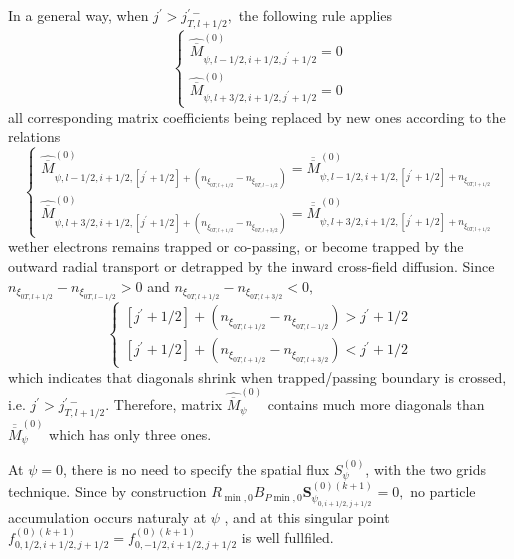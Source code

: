 In a general way, when $j^{\prime }>j_{T,l+1/2}^{\prime -},$ the following
rule applies
\begin{equation}
\left\{
\begin{array}{l}
\widehat{\overline{M}}_{\psi ,l-1/2,i+1/2,j^{\prime }+1/2}^{\left( 0\right)
}=0 \\
\widehat{\overline{M}}_{\psi ,l+3/2,i+1/2,j^{\prime }+1/2}^{\left( 0\right)
}=0
\end{array}
\right.
\end{equation}
all corresponding matrix coefficients being replaced by new ones according
to the relations
\begin{equation}
\left\{
\begin{array}{l}
\widehat{\overline{M}}_{\psi ,l-1/2,i+1/2,\left[ j^{\prime }+1/2\right]
+\left( n_{\xi _{0T,l+1/2}}-n_{\xi _{0T,l-1/2}}\right) }^{\left( 0\right) }=%
\overline{\overline{M}}_{\psi ,l-1/2,i+1/2,\left[ j^{\prime }+1/2\right]
+n_{\xi _{0T,l+1/2}}}^{\left( 0\right) } \\
\widehat{\overline{M}}_{\psi ,l+3/2,i+1/2,\left[ j^{\prime }+1/2\right]
+\left( n_{\xi _{0T,l+1/2}}-n_{\xi _{0T,l+3/2}}\right) }^{\left( 0\right) }=%
\overline{\overline{M}}_{\psi ,l+3/2,i+1/2,\left[ j^{\prime }+1/2\right]
+n_{\xi _{0T,l+1/2}}}^{\left( 0\right) }
\end{array}
\right.
\end{equation}
wether electrons remains trapped or co-passing, or become trapped by the
outward radial transport or detrapped by the inward cross-field diffusion.
Since $n_{\xi _{0T,l+1/2}}-n_{\xi _{0T,l-1/2}}>0$ and $n_{\xi
_{0T,l+1/2}}-n_{\xi _{0T,l+3/2}}<0,$
\begin{equation}
\left\{
\begin{array}{l}
\left[ j^{\prime }+1/2\right] +\left( n_{\xi _{0T,l+1/2}}-n_{\xi
_{0T,l-1/2}}\right) >j^{\prime }+1/2 \\
\left[ j^{\prime }+1/2\right] +\left( n_{\xi _{0T,l+1/2}}-n_{\xi
_{0T,l+3/2}}\right) <j^{\prime }+1/2
\end{array}
\right.
\end{equation}
which indicates that diagonals shrink when trapped/passing boundary is
crossed, i.e. $j^{\prime }>j_{T,l+1/2}^{\prime -}.$ Therefore, matrix $%
\widehat{\overline{M}}_{\psi }^{\left( 0\right) }$ contains much more
diagonals than $\overline{\overline{M}}_{\psi }^{\left( 0\right) }$ which
has only three ones.

At $\psi =0$, there is no need to specify the spatial flux $S_{\psi
}^{\left( 0\right) }$, with the two grids technique. Since by construction $%
R_{\min ,0}B_{P\min ,0}\mathbf{S}_{\psi _{0,i+1/2,j+1/2}}^{\left( 0\right)
(k+1)}=0,$ no particle accumulation occurs naturaly at $\psi $ , and at this
singular point $f_{0,1/2,i+1/2,j+1/2}^{\left( 0\right)
(k+1)}=f_{0,-1/2,i+1/2,j+1/2}^{\left( 0\right) (k+1)}$ is well fullfiled.

